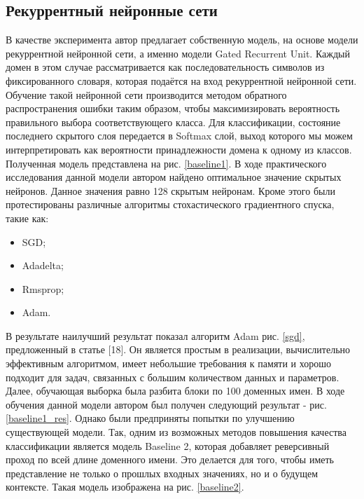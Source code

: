     \subsection{Рекуррентный нейронные сети}\label{lstm_class_exp}
    В качестве эксперимента автор предлагает собственную модель, на основе модели рекуррентной нейронной сети, а именно модели Gated Recurrent Unit. Каждый домен в этом случае рассматривается как последовательность символов из фиксированного словаря, которая подаётся на вход рекуррентной нейронной сети. Обучение такой нейронной сети производится методом обратного распространения ошибки таким образом, чтобы максимизировать вероятность правильного выбора соответствующего класса. Для классификации, состояние последнего скрытого слоя передается в Softmax слой, выход которого мы можем интерпретировать как вероятности принадлежности домена к одному из классов. Полученная модель представлена на рис. \ref{baseline1}.
    В ходе практического исследования данной модели автором найдено оптимальное значение скрытых нейронов. Данное значения равно 128 скрытым нейронам. %
    Кроме этого были протестированы различные алгоритмы стохастического градиентного спуска, такие как:
    \begin{itemize}
    \item SGD;
    \item Adadelta;
    \item Rmsprop;
    \item Adam.
    \end{itemize}
    В результате наилучший результат показал алгоритм Adam рис. \ref{sgd}, предложенный в статье [18]. Он является простым в реализации, вычислительно эффективным алгоритмом, имеет небольшие требования к памяти и хорошо подходит для задач, связанных с большим количеством данных и параметров.
    Далее, обучающая выборка была разбита блоки по 100 доменных имен. В ходе обучения данной модели автором был получен следующий результат - рис. \ref{baseline1_res}.
    Однако были предприняты попытки по улучшению существующей модели. Так, одним из возможных методов повышения качества классификации является модель Baseline 2, которая добавляет реверсивный проход по всей длине доменного имени. Это делается для того, чтобы иметь представление не только о прошлых входных значениях, но и о будущем контексте. Такая модель изображена на рис. \ref{baseline2}.
